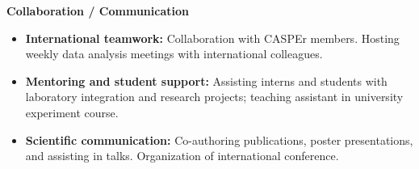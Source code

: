 \noindent\textbf{Collaboration / Communication}
\begin{itemize}
    \item \textbf{International teamwork:} Collaboration with CASPEr members. Hosting weekly data analysis meetings with international colleagues.
    \item \textbf{Mentoring and student support:} Assisting interns and students with laboratory integration and research projects; teaching assistant in university experiment course.
    \item \textbf{Scientific communication:} Co-authoring publications, poster presentations, and assisting in talks. Organization of international conference. 
\end{itemize}






\par\endgroup
